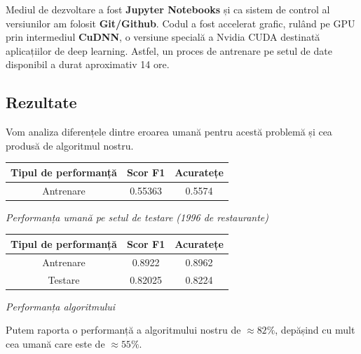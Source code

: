 Mediul de dezvoltare a fost \textbf{Jupyter Notebooks} și ca sistem de control al versiunilor am folosit \textbf{Git/Github}. Codul a fost accelerat grafic, rulând pe GPU prin intermediul \textbf{CuDNN}, o versiune specială a Nvidia CUDA destinată aplicațiilor de deep learning. Astfel, un proces de antrenare pe setul de date disponibil a durat aproximativ 14 ore.

\subsection{Rezultate}
Vom analiza diferențele dintre eroarea umană pentru acestă problemă și cea produsă de algoritmul nostru.

\begin{center}
\begin{tabular}{|c|c|c|}
\hline Tipul de performanță & Scor F1 & Acuratețe \\
\hline Antrenare & 0.55363 & 0.5574 \\
\hline
\end{tabular}
\end{center}

\begin{center}
\textit{Performanța umană pe setul de testare (1996 de restaurante)}
\end{center}

\begin{center}
\begin{tabular}{|c|c|c|}
\hline Tipul de performanță & Scor F1 & Acuratețe \\
\hline Antrenare & 0.8922 & 0.8962 \\
\hline Testare & 0.82025 & 0.8224  \\
\hline
\end{tabular}
\end{center}

\begin{center}
\textit{Performanța algoritmului}
\end{center}

Putem raporta o performanță a algoritmului nostru de $\approx 82\%$, depășind cu mult cea umană care este de $\approx 55\%$.